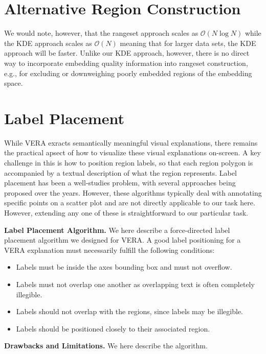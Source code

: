 \documentclass[10pt]{article}
\begin{document}
\appendix

\section{Alternative Region Construction}
\label{appendix:region_construction}

We would note, however, that the rangeset approach scales as $\mathcal{O}(N \log N)$ while the KDE approach scales as $\mathcal{O}(N)$ meaning that for larger data sets, the KDE approach will be faster.
Unlike our KDE approach, however, there is no direct way to incorporate embedding quality information into rangeset construction, e.g., for excluding or downweighing poorly embedded regions of the embedding space.


\section{Label Placement}
\label{sec:label-placement}

While VERA exracts semantically meaningful visual explanations, there remains the practical apsect of how to visualize these visual explanations on-screen. A key challenge in this is how to position region labels, so that each region polygon is accompanied by a textual description of what the region represents.
Label placement has been a well-studies problem, with several approaches being proposed over the years. However, these algorithms typically deal with annotating specific points on a scatter plot and are not directly applicable to our task here.
However, extending any one of these is straightforward to our particular task.

\noindent \textbf{Label Placement Algorithm.} We here describe a force-directed label placement algorithm we designed for VERA. A good label positioning for a VERA explanation must necessarily fulfill the following conditions:
\begin{itemize}
  \item Labels must be inside the axes bounding box and must not overflow.
  \item Labels must not overlap one another as overlapping text is often completely illegible.
  \item Labels should not overlap with the regions, since labels may be illegible.
  \item Labels should be positioned closely to their associated region.
\end{itemize}

\noindent \textbf{Drawbacks and Limitations.} We here describe the algorithm.
\end{document}
